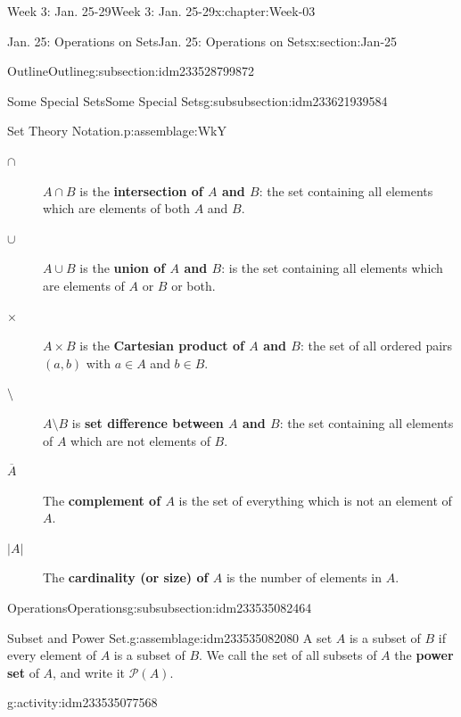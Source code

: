 \documentclass[oneside,10pt,]{book}
\newcommand{\terminology}[1]{\textbf{#1}}
\numberwithin{equation}{section}
\def\pow{{\mathcal P}}
\newcommand{\pow}{\mathcal P}
\renewcommand{\bar}{\overline}
\newcommand{\card}[1]{\left| #1 \right|}
\begin{document}
\begin{chapterptx}{Week 3: Jan. 25-29}{}{Week 3: Jan. 25-29}{}{}{x:chapter:Week-03}
\begin{sectionptx}{Jan. 25: Operations on Sets}{}{Jan. 25: Operations on Sets}{}{}{x:section:Jan-25}
\begin{subsectionptx}{Outline}{}{Outline}{}{}{g:subsection:idm233528799872}
\begin{subsubsectionptx}{Some Special Sets}{}{Some Special Sets}{}{}{g:subsubsection:idm233621939584}
\begin{assemblage}{Set Theory Notation.}{p:assemblage:WkY}
\begin{description}
\item[{\(\cap\)}]\(A \cap B\) is the \terminology{intersection of \(A\) and \(B\)}: the set containing all elements which are elements of both \(A\) and \(B\). \label{g:notation:idm233535113760}%
\item[{\(\cup\)}]\(A \cup B\) is the \terminology{union of \(A\) and \(B\)}: is the set containing all elements which are elements of \(A\) or \(B\) or both. \label{g:notation:idm233535107808}%
\item[{\(\times\)}]\(A \times B\) is the \terminology{Cartesian product of \(A\) and \(B\)}: the set of all ordered pairs \((a,b)\) with \(a \in A\) and \(b \in B\). \label{g:notation:idm233535101568}%
\item[{\(\setminus\)}]\(A \setminus B\) is \terminology{set difference between \(A\) and \(B\)}: the set containing all elements of \(A\) which are not elements of \(B\). \label{g:notation:idm233535095456}%
\item[{\(\bar{A}\)}]The \terminology{complement of \(A\)} is the set of everything which is not an element of \(A\). \label{g:notation:idm233535090752}%
\item[{\(\card{A}\)}]The \terminology{cardinality (or size) of \(A\)} is the number of elements in \(A\). \label{g:notation:idm233535085792}%
\end{description}
%
\end{assemblage}
\end{subsubsectionptx}
%
%
\typeout{************************************************}
\typeout{************************************************}
%
\begin{subsubsectionptx}{Operations}{}{Operations}{}{}{g:subsubsection:idm233535082464}
\begin{assemblage}{Subset and Power Set.}{g:assemblage:idm233535082080}%
A set \(A\) is a subset of \(B\) if every element of \(A\) is a subset of \(B\). We call the set of all subsets of \(A\) the \terminology{power set} of \(A\), and write it \(\pow(A)\).%
\end{assemblage}
\begin{activity}{}{g:activity:idm233535077568}%

\end{activity}
\end{subsubsectionptx}
\end{subsectionptx}
\end{sectionptx}
\end{chapterptx}
\end{document}
